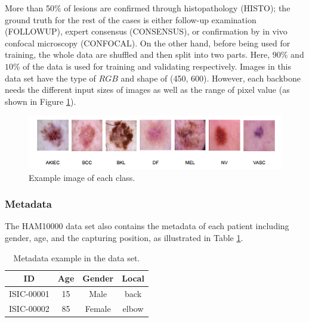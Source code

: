 \documentclass[sensors,article,accept,pdftex,moreauthors]{Definitions/mdpi}
\begin{document}
	
	More than 50\% of lesions are confirmed through histopathology (HISTO); the ground truth for the rest of the cases is either follow-up examination (FOLLOWUP), expert consensus (CONSENSUS), or confirmation by in vivo confocal microscopy (CONFOCAL). On the other hand, before being used for training, the whole data are shuffled and then split into two parts. Here, $90$\% and $10$\% of the data is used for training and validating respectively. Images in this data set have the type of $RGB$ and shape of (450, 600). However, each backbone needs the different input sizes of images as well as the range of pixel value {(as shown in Figure \mbox{\ref{fig:data-sample}})}.
	\begin{figure}[H]
		\includegraphics[width=0.8\linewidth]{Definitions/DataDistribution}
		\caption{{Example} %
 image of each class.}
		\label{fig:data-sample}
	\end{figure}	
	
	\subsubsection{Metadata}
	The HAM10000 data set \cite{10417} also contains the metadata of each patient including gender, age, and the capturing position, as illustrated in Table \ref{table:metadata sample}.
	\begin{table}[H]
		\caption{{Metadata}  example in the data set.}%
		\label{table:metadata sample}
		\setlength{\tabcolsep}{11.8mm}\begin{tabular}{c c c c } 
\toprule
\textbf{ID} & \textbf{Age} & \textbf{Gender} & \textbf{Local}\\ 
\midrule
ISIC-00001 & 15 & Male & back\\
\midrule
ISIC-00002 & 85 & Female & elbow\\
\bottomrule
		\end{tabular}
	\end{table}
\end{document}
